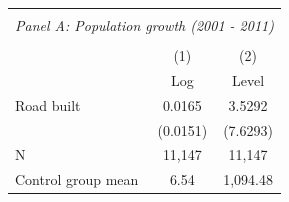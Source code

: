 \begin{tabular}{l*{2}{c}} \hline
\hline \\ \multicolumn{3}{c}{\textit{Panel A: Population growth (2001 - 2011)}} \\\\ [-1ex] \hline         &\multicolumn{1}{c}{(1)} & \multicolumn{1}{c}{(2)} \\        &\multicolumn{1}{c}{Log} &\multicolumn{1}{c}{Level} \\ \hline
Road built               &      0.0165   &      3.5292   \\
                         &    (0.0151)   &    (7.6293)   \\
\hline
N                        &      11,147   &      11,147   \\
Control group mean       &        6.54   &    1,094.48   \\
\hline \end{tabular}
